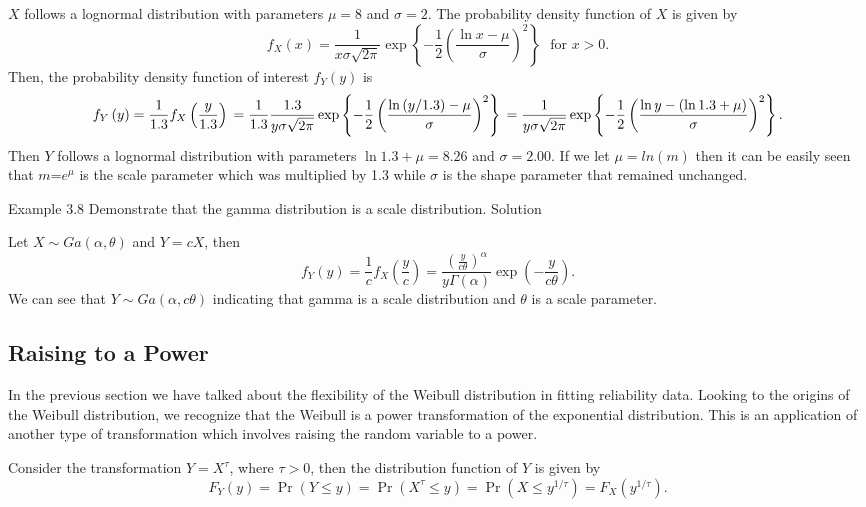 \documentclass[]{book}
\theoremstyle{definition}
\theoremstyle{definition}
\theoremstyle{definition}
\theoremstyle{remark}
\begin{document}
\(X\) follows a lognormal distribution with parameters \(\mu = 8\) and
\(\sigma = 2\). The probability density function of \(X\) is given by
\[f_{X}\left( x \right) = \frac{1}{x \sigma \sqrt{2\pi}}\exp \left\{- \frac{1}{2}\left( \frac{\ln x - \mu}{\sigma} \right)^{2}\right\} \ \ \ \text{for } x > 0.\]
Then, the probability density function of interest \(f_{Y}(y)\) is
\[f_{Y}\left( y \right) = \frac{1}{1.3}f_{X}\left( \frac{y}{1.3} \right) \\
= \frac{1}{1.3}\frac{1.3}{y \sigma \sqrt{2\pi}}\exp \left\{- \frac{1}{2}\left( \frac{\ln\left( y/1.3 \right) - \mu}{\sigma} \right)^{2}\right\} \\
= \frac{1}{y \sigma\sqrt{2\pi}}\exp \left\{- \frac{1}{2}\left( \frac{\ln y - \left( \ln 1.3 + \mu \right)}{\sigma} \right)^{2}\right\}.\]
Then \(Y\) follows a lognormal distribution with parameters
\(\ln 1.3 + \mu = 8.26\) and \(\sigma = 2.00\). If we let
\(\mu = ln(m)\) then it can be easily seen that \(m\)=\(e^{\mu}\) is the
scale parameter which was multiplied by 1.3 while \(\sigma\) is the
shape parameter that remained unchanged.

Example 3.8 Demonstrate that the gamma distribution is a scale
distribution. Solution

Let \(X\sim Ga(\alpha,\theta)\) and \(Y = cX\), then
\[f_{Y}\left( y \right) = \frac{1}{c}f_{X}\left( \frac{y}{c} \right) = \frac{\left( \frac{y}{c\theta} \right)^{\alpha}}{y\Gamma\left( \alpha \right)}\exp \left( - \frac{y}{c\theta} \right)  .\]
We can see that \(Y\sim Ga(\alpha,c\theta)\) indicating that gamma is a
scale distribution and \(\theta\) is a scale parameter.

\subsection{Raising to a Power}\label{raising-to-a-power}

In the previous section we have talked about the flexibility of the
Weibull distribution in fitting reliability data. Looking to the origins
of the Weibull distribution, we recognize that the Weibull is a power
transformation of the exponential distribution. This is an application
of another type of transformation which involves raising the random
variable to a power.

Consider the transformation \(Y = X^{\tau}\), where \(\tau > 0\), then
the distribution function of \(Y\) is given by
\[F_{Y}\left( y \right) = \Pr\left( Y \leq y \right) = \Pr\left( X^{\tau} \leq y \right) = \Pr\left( X \leq y^{1/ \tau} \right) = F_{X}\left( y^{1/ \tau} \right).\]
\end{document}
